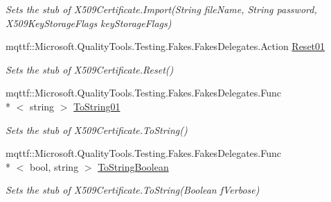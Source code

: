 \begin{DoxyCompactItemize}
\begin{DoxyCompactList}\small\item\em Sets the stub of X509\-Certificate.\-Import(\-String file\-Name, String password, X509\-Key\-Storage\-Flags key\-Storage\-Flags)\end{DoxyCompactList}\item 
mqttf\-::\-Microsoft.\-Quality\-Tools.\-Testing.\-Fakes.\-Fakes\-Delegates.\-Action \hyperlink{class_system_1_1_security_1_1_cryptography_1_1_x509_certificates_1_1_fakes_1_1_stub_x509_certificate_a634e4527d4b78c3080242fed1ab3a9e3}{Reset01}
\begin{DoxyCompactList}\small\item\em Sets the stub of X509\-Certificate.\-Reset()\end{DoxyCompactList}\item 
mqttf\-::\-Microsoft.\-Quality\-Tools.\-Testing.\-Fakes.\-Fakes\-Delegates.\-Func\\*
$<$ string $>$ \hyperlink{class_system_1_1_security_1_1_cryptography_1_1_x509_certificates_1_1_fakes_1_1_stub_x509_certificate_aba8fd1e59eac58525eb9b65e6a903a59}{To\-String01}
\begin{DoxyCompactList}\small\item\em Sets the stub of X509\-Certificate.\-To\-String()\end{DoxyCompactList}\item 
mqttf\-::\-Microsoft.\-Quality\-Tools.\-Testing.\-Fakes.\-Fakes\-Delegates.\-Func\\*
$<$ bool, string $>$ \hyperlink{class_system_1_1_security_1_1_cryptography_1_1_x509_certificates_1_1_fakes_1_1_stub_x509_certificate_a408d5fa0f869f9dcb079f0c65b21f4d6}{To\-String\-Boolean}
\begin{DoxyCompactList}\small\item\em Sets the stub of X509\-Certificate.\-To\-String(\-Boolean f\-Verbose)\end{DoxyCompactList}\end{DoxyCompactItemize}
